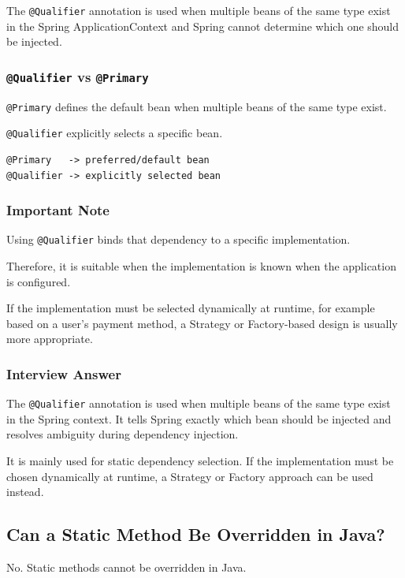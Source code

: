 \documentclass[12pt,a4paper]{article}
\begin{document}
The \texttt{@Qualifier} annotation is used when multiple beans of the same
type exist in the Spring ApplicationContext and Spring cannot determine
which one should be injected.

\subsubsection*{\texttt{@Qualifier} vs \texttt{@Primary}}

\texttt{@Primary} defines the default bean when multiple beans of the same
type exist.

\texttt{@Qualifier} explicitly selects a specific bean.

\begin{verbatim}
@Primary   -> preferred/default bean
@Qualifier -> explicitly selected bean
\end{verbatim}

\subsubsection*{Important Note}

Using \texttt{@Qualifier} binds that dependency to a specific implementation.

Therefore, it is suitable when the implementation is known when the
application is configured.

If the implementation must be selected dynamically at runtime, for example
based on a user's payment method, a Strategy or Factory-based design is
usually more appropriate.

\subsubsection*{Interview Answer}

The \texttt{@Qualifier} annotation is used when multiple beans of the same
type exist in the Spring context. It tells Spring exactly which bean should
be injected and resolves ambiguity during dependency injection.

It is mainly used for static dependency selection. If the implementation
must be chosen dynamically at runtime, a Strategy or Factory approach can
be used instead.

\subsection{Can a Static Method Be Overridden in Java?}

No. Static methods cannot be overridden in Java.
\end{document}
